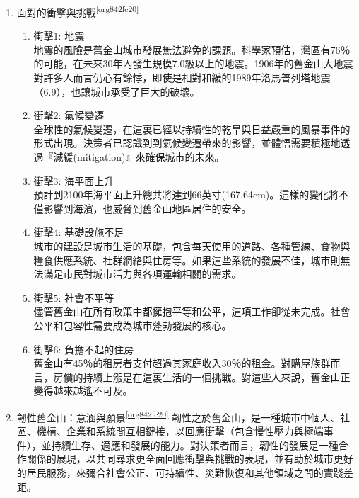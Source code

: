 \documentclass[a4paper,12pt]{article}
\begin{document}
\begin{enumerate}
\item 面對的衝擊與挑戰\textsuperscript{\ref{org842fc20}}
\label{sec:org0b93a39}
\begin{enumerate}
\item 衝擊1: 地震\\
地震的風險是舊金山城市發展無法避免的課題。科學家預估，灣區有76％的可能，在未來30年內發生規模7.0級以上的地震。1906年的舊金山大地震對許多人而言仍心有餘悸，即使是相對和緩的1989年洛馬普列塔地震（6.9），也讓城市承受了巨大的破壞。\\
\item 衝擊2: 氣候變遷\\
全球性的氣候變遷，在這裏已經以持續性的乾旱與日益嚴重的風暴事件的形式出現。決策者已認識到到氣候變遷帶來的影響，並體悟需要積極地透過『減緩(mitigation)』來確保城市的未來。\\
\item 衝擊3: 海平面上升\\
預計到2100年海平面上升總共將達到66英寸(167.64cm)。這樣的變化將不僅影響到海濱，也威脅到舊金山地區居住的安全。\\
\item 衝擊4: 基礎設施不足\\
城市的建設是城市生活的基礎，包含每天使用的道路、各種管線、食物與糧食供應系統、社群網絡與住房等。如果這些系統的發展不佳，城市則無法滿足市民對城市活力與各項運輸相關的需求。\\
\item 衝擊5: 社會不平等\\
儘管舊金山在所有政策中都擁抱平等和公平，這項工作卻從未完成。社會公平和包容性需要成為城市蓬勃發展的核心。\\
\item 衝擊6: 負擔不起的住房\\
舊金山有45％的租房者支付超過其家庭收入30％的租金。對購屋族群而言，房價的持續上漲是在這裏生活的一個挑戰。對這些人來說，舊金山正變得越來越遙不可及。\\
\end{enumerate}

\item 韌性舊金山：意涵與願景\textsuperscript{\ref{org842fc20}}
\label{sec:orgea4eef7}
韌性之於舊金山，是一種城市中個人、社區、機構、企業和系統間互相鍵接，以回應衝擊（包含慢性壓力與極端事件），並持續生存、適應和發展的能力。對決策者而言，韌性的發展是一種合作關係的展現，以共同尋求更全面回應衝擊與挑戰的表現，並有助於城市更好的居民服務，來彌合社會公正、可持續性、災難恢復和其他領域之間的實踐差距。\\


\end{enumerate}
\end{document}
